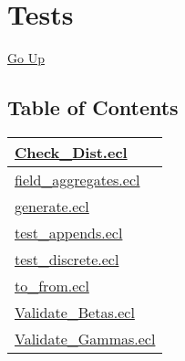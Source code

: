 \chapter*{\color{headtoc} Tests}
\hypertarget{ecldoc:toc:root/ML_Core/Tests}{}
\hyperlink{ecldoc:toc:}{Go Up}


\section*{Table of Contents}
{\renewcommand{\arraystretch}{1.5}
\begin{longtable}{|p{\textwidth}|}
\hline
\hyperlink{ecldoc:toc:ML_Core.Tests.Check_Dist}{Check\_Dist.ecl} \\
\hline
\hyperlink{ecldoc:toc:ML_Core.Tests.field_aggregates}{field\_aggregates.ecl} \\
\hline
\hyperlink{ecldoc:toc:ML_Core.Tests.generate}{generate.ecl} \\
\hline
\hyperlink{ecldoc:toc:ML_Core.Tests.test_appends}{test\_appends.ecl} \\
\hline
\hyperlink{ecldoc:toc:ML_Core.Tests.test_discrete}{test\_discrete.ecl} \\
\hline
\hyperlink{ecldoc:toc:ML_Core.Tests.to_from}{to\_from.ecl} \\
\hline
\hyperlink{ecldoc:toc:ML_Core.Tests.Validate_Betas}{Validate\_Betas.ecl} \\
\hline
\hyperlink{ecldoc:toc:ML_Core.Tests.Validate_Gammas}{Validate\_Gammas.ecl} \\
\hline
\end{longtable}
}









